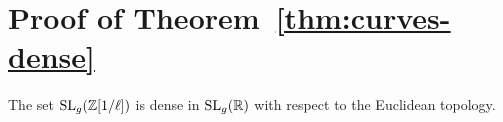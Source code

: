 \documentclass{amsart}
\begin{document}



\section{Proof of Theorem~\ref{thm:curves-dense}}
\label{sec:step-1}


\begin{lemma}\label{lemma:sl-z-1overl-dense-sl-r}
  The set $\operatorname{SL}_g(\mathbb{Z}[1/\ell])$ is dense in $\operatorname{SL}_g(\mathbb{R})$ with respect to the Euclidean topology.
\end{lemma}
\end{document}
